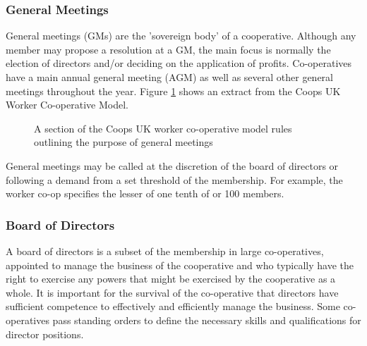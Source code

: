 \subsubsection{General Meetings}
General meetings (GMs) are the 'sovereign body' of a cooperative. Although any member may propose a resolution at a GM, the main focus is normally the election of directors and/or deciding on the application of profits. Co-operatives have a main annual general meeting (AGM) as well as several other general meetings throughout the year. Figure \ref{fig:workerCoopGM} shows an extract from the Coops UK Worker Co-operative Model.\\
\begin{figure}
\centering
{}
\decoRule
\caption[Worker Coop General Meeting Definition]{A section of the Coops UK worker co-operative model rules outlining the purpose of general meetings}
\label{fig:workerCoopGM}
\end{figure} 

General meetings may be called at the discretion of the board of directors or following a demand from a set threshold of the membership. For example, the worker co-op specifies the lesser of one tenth of or 100 members.

\subsubsection{Board of Directors}
A board of directors is a subset of the membership in large co-operatives, appointed to manage the business of the cooperative and who typically have the right to exercise any powers that might be exercised by the cooperative as a whole. It is important for the survival of the co-operative that directors have sufficient competence to effectively and efficiently manage the business. Some co-operatives pass standing orders to define the necessary skills and qualifications for director positions.


